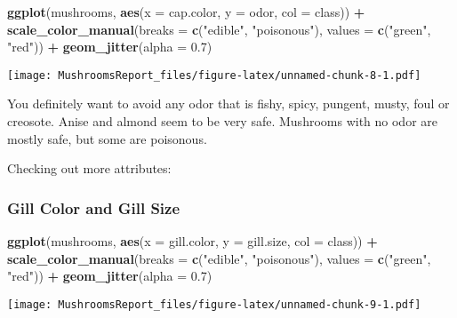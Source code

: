 \documentclass[]{article}
\newenvironment{Shaded}{\begin{snugshade}}{\end{snugshade}}
\newcommand{\KeywordTok}[1]{\textcolor[rgb]{0.13,0.29,0.53}{\textbf{#1}}}
\newcommand{\DataTypeTok}[1]{\textcolor[rgb]{0.13,0.29,0.53}{#1}}
\newcommand{\FloatTok}[1]{\textcolor[rgb]{0.00,0.00,0.81}{#1}}
\newcommand{\StringTok}[1]{\textcolor[rgb]{0.31,0.60,0.02}{#1}}
\newcommand{\OperatorTok}[1]{\textcolor[rgb]{0.81,0.36,0.00}{\textbf{#1}}}
\newcommand{\NormalTok}[1]{#1}
\begin{document}
\begin{Shaded}
\begin{Highlighting}[]
\KeywordTok{ggplot}\NormalTok{(mushrooms, }\KeywordTok{aes}\NormalTok{(}\DataTypeTok{x =}\NormalTok{ cap.color, }\DataTypeTok{y =}\NormalTok{ odor, }\DataTypeTok{col =}\NormalTok{ class)) }\OperatorTok{+}\StringTok{ }
\StringTok{  }\KeywordTok{scale_color_manual}\NormalTok{(}\DataTypeTok{breaks =} \KeywordTok{c}\NormalTok{(}\StringTok{"edible"}\NormalTok{, }\StringTok{"poisonous"}\NormalTok{), }
                     \DataTypeTok{values =} \KeywordTok{c}\NormalTok{(}\StringTok{"green"}\NormalTok{, }\StringTok{"red"}\NormalTok{)) }\OperatorTok{+}
\StringTok{  }\KeywordTok{geom_jitter}\NormalTok{(}\DataTypeTok{alpha =} \FloatTok{0.7}\NormalTok{) }
\end{Highlighting}
\end{Shaded}

\texttt{[image: MushroomsReport\_files/figure-latex/unnamed-chunk-8-1.pdf]}

You definitely want to avoid any odor that is fishy, spicy, pungent,
musty, foul or creosote. Anise and almond seem to be very safe.
Mushrooms with no odor are mostly safe, but some are poisonous.

Checking out more attributes:

\subsubsection{Gill Color and Gill Size}\label{gill-color-and-gill-size}

\begin{Shaded}
\begin{Highlighting}[]
\KeywordTok{ggplot}\NormalTok{(mushrooms, }\KeywordTok{aes}\NormalTok{(}\DataTypeTok{x =}\NormalTok{ gill.color, }\DataTypeTok{y =}\NormalTok{ gill.size, }\DataTypeTok{col =}\NormalTok{ class)) }\OperatorTok{+}\StringTok{ }
\StringTok{  }\KeywordTok{scale_color_manual}\NormalTok{(}\DataTypeTok{breaks =} \KeywordTok{c}\NormalTok{(}\StringTok{"edible"}\NormalTok{, }\StringTok{"poisonous"}\NormalTok{), }
                     \DataTypeTok{values =} \KeywordTok{c}\NormalTok{(}\StringTok{"green"}\NormalTok{, }\StringTok{"red"}\NormalTok{)) }\OperatorTok{+}
\StringTok{  }\KeywordTok{geom_jitter}\NormalTok{(}\DataTypeTok{alpha =} \FloatTok{0.7}\NormalTok{) }
\end{Highlighting}
\end{Shaded}

\texttt{[image: MushroomsReport\_files/figure-latex/unnamed-chunk-9-1.pdf]}
\end{document}
